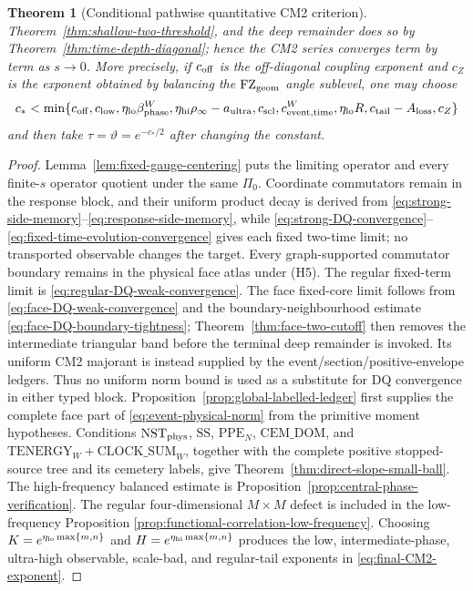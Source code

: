 \documentclass[11pt]{article}
\newtheorem{theorem}{Theorem}[section]
\begin{document}
\begin{theorem}[Conditional pathwise quantitative CM2 criterion]
Theorem~\ref{thm:shallow-two-threshold}, and the deep remainder does so by
Theorem~\ref{thm:time-depth-diagonal}; hence the CM2 series converges term by
term as $s\to0$.  More
precisely, if $c_{\rm off}$ is the off-diagonal coupling exponent and $c_Z$
is the exponent obtained by balancing the $\mathrm{FZ}_{\rm geom}$ angle sublevel, one
may choose
\begin{equation}
\label{eq:final-CM2-exponent}
 c_*<\min\{c_{\rm off},c_{\rm low},
 \eta_{\rm lo}\beta_{\rm phase}^{W},
 \eta_{\rm hi}\rho_\infty-a_{\rm ultra},c_{\rm scl},
 c_{\rm event,time}^{W},\eta_{\rm lo}R,
 c_{\rm tail}-A_{\rm loss},c_Z\}
\end{equation}
and then take $\tau=\vartheta=e^{-c_*/2}$ after changing the constant.
\end{theorem}

\begin{proof}
Lemma~\ref{lem:fixed-gauge-centering} puts the limiting operator and every
finite-$s$ operator quotient under the same $\Pi_0$.  Coordinate
commutators remain in the response block, and their uniform product decay is
derived from \eqref{eq:strong-side-memory}--\eqref{eq:response-side-memory},
while \eqref{eq:strong-DQ-convergence}--
\eqref{eq:fixed-time-evolution-convergence} gives each fixed two-time limit; no
transported observable changes the target.  Every graph-supported
commutator boundary remains in the physical face atlas under \textup{(H5)}.
The regular fixed-term limit is
\eqref{eq:regular-DQ-weak-convergence}.  The face fixed-core limit follows
from \eqref{eq:face-DQ-weak-convergence} and the boundary-neighbourhood
estimate \eqref{eq:face-DQ-boundary-tightness};
Theorem~\ref{thm:face-two-cutoff} then removes the intermediate triangular
band before the terminal deep remainder is invoked.  Its uniform CM2
majorant is instead supplied by the event/section/positive-envelope ledgers.
Thus no
uniform norm bound is used as a substitute for DQ convergence in either
typed block.
Proposition~\ref{prop:global-labelled-ledger} first supplies the complete face
part of \eqref{eq:event-physical-norm} from the primitive moment hypotheses.
Conditions $\mathrm{NST}_{\rm phys}$, $\mathrm{SS}$,
$\mathrm{PPE}_{N}$, $\mathrm{CEM\_DOM}$, and
$\mathrm{TENERGY}_{W}+\mathrm{CLOCK\_SUM}_{W}$, together with the complete
positive stopped-source tree and its cemetery labels, give
Theorem~\ref{thm:direct-slope-small-ball}.  The high-frequency balanced
estimate is Proposition~\ref{prop:central-phase-verification}.  The regular
four-dimensional $M\times M$ defect is included in the low-frequency Proposition
\ref{prop:functional-correlation-low-frequency}.  Choosing
$K=e^{\eta_{\rm lo}\max\{m,n\}}$ and
$H=e^{\eta_{\rm hi}\max\{m,n\}}$ produces the low, intermediate-phase,
ultra-high observable, scale-bad, and regular-tail exponents in
\eqref{eq:final-CM2-exponent}.


\end{proof}
\end{document}
